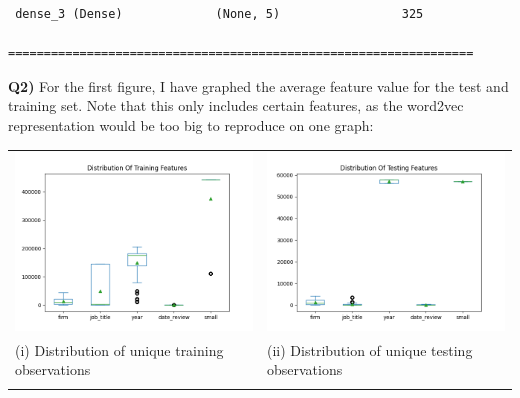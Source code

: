 \documentclass{article}
\begin{document}
\begin{titlepage}
\begin{lstlisting}
 dense_3 (Dense)             (None, 5)                 325       
                                                                 
=================================================================
\end{lstlisting}

\newpage

\textbf{Q2)} For the first figure, I have graphed the average feature value for the test and training set. Note that this only includes certain features, as the word2vec representation would be too big to reproduce on one graph:

\begin{tabular}{ll}

 \includegraphics[width=.5\linewidth]{q1train.png} &  \includegraphics[width=.5\linewidth]{q1test.png}\\
 \hfil (i) Distribution of unique training observations  \hfil & \hfil (ii) Distribution of unique testing observations \hfil \\\\
 
\end{tabular}


\end{titlepage}
\end{document}
